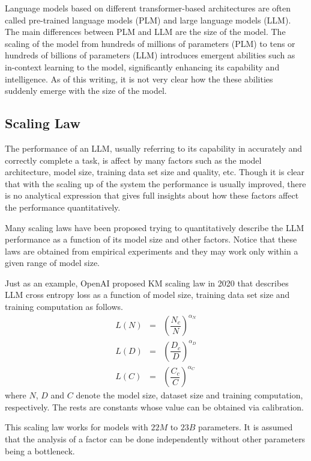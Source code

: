 Language models based on different transformer-based architectures are often called pre-trained language models (PLM) and large language models (LLM). The main differences between PLM and LLM are the size of the model. The scaling of the model from hundreds of millions of parameters (PLM) to tens or hundreds of billions of parameters (LLM) introduces emergent abilities such as in-context learning to the model, significantly enhancing its capability and intelligence. As of this writing, it is not very clear how the these abilities suddenly emerge with the size of the model.

\subsection{Scaling Law}

The performance of an LLM, usually referring to its capability in accurately and correctly complete a task, is affect by many factors such as the model architecture, model size, training data set size and quality, etc. Though it is clear that with the scaling up of the system the performance is usually improved, there is no analytical expression that gives full insights about how these factors affect the performance quantitatively.

Many scaling laws have been proposed trying to quantitatively describe the LLM performance as a function of its model size and other factors. Notice that these laws are obtained from empirical experiments and they may work only within a given range of model size.

Just as an example, OpenAI proposed KM scaling law in 2020 that describes LLM cross entropy loss as a function of model size, training data set size and training computation as follows.
\begin{eqnarray}
	L(N) &=& \left(\dfrac{N_c}{N}\right)^{\alpha_N} \nonumber \\
	L(D) &=& \left(\dfrac{D_c}{D}\right)^{\alpha_D} \nonumber \\
	L(C) &=& \left(\dfrac{C_c}{C}\right)^{\alpha_C} \nonumber
\end{eqnarray}
where $N$, $D$ and $C$ denote the model size, dataset size and training computation, respectively. The rests are constants whose value can be obtained via calibration.

This scaling law works for models with $22M$ to $23B$ parameters. It is assumed that the analysis of a factor can be done independently without other parameters being a bottleneck.

